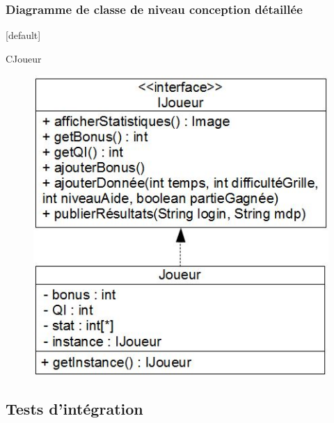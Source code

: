 \documentclass{beamer}
\begin{document}
\begin{frame}
\frametitle{Diagramme de classe de niveau conception détaillée}
 [default]
  \begin{block}{\footnotesize{CJoueur}}
    \begin{figure}[h]
      \includegraphics[scale=0.37]{diagramme_classe_detaillee_CJoueur.JPG}
    \end{figure}
  \end{block}
\end{frame}

\subsection{Tests d’intégration}
\begin{frame}
 
\end{frame}
\end{document}
